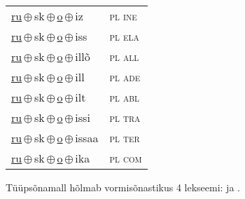 \begin{minipage}{\textwidth}
\begin{sideways}
\begin{tabular}{l l}
\underline{ru}\,$\oplus$\,sk\,$\oplus$\,\underline{o}\,$\oplus$\,iz & \textsc{ pl ine } \\
\underline{ru}\,$\oplus$\,sk\,$\oplus$\,\underline{o}\,$\oplus$\,iss & \textsc{ pl ela } \\
\underline{ru}\,$\oplus$\,sk\,$\oplus$\,\underline{o}\,$\oplus$\,illõ & \textsc{ pl all } \\
\underline{ru}\,$\oplus$\,sk\,$\oplus$\,\underline{o}\,$\oplus$\,ill & \textsc{ pl ade } \\
\underline{ru}\,$\oplus$\,sk\,$\oplus$\,\underline{o}\,$\oplus$\,ilt & \textsc{ pl abl } \\
\underline{ru}\,$\oplus$\,sk\,$\oplus$\,\underline{o}\,$\oplus$\,issi & \textsc{ pl tra } \\
\underline{ru}\,$\oplus$\,sk\,$\oplus$\,\underline{o}\,$\oplus$\,issaa & \textsc{ pl ter } \\
\underline{ru}\,$\oplus$\,sk\,$\oplus$\,\underline{o}\,$\oplus$\,ika & \textsc{ pl com } \\
\end{tabular}
\end{sideways}
\label{tab:tüüpsõnamall-rusko}

\end{minipage}

 
\vspace{1em}
\noindent Tüüpsõnamall  hõlmab vormisõnastikus 4 lekseemi:  ja .
